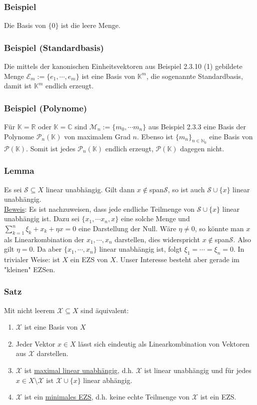 \subsubsection{Beispiel}
Die Basis von $\{0\}$ ist die leere Menge.
\subsubsection{Beispiel (Standardbasis)}
Die mittels der kanonischen Einheitsvektoren aus Beispiel 2.3.10 (1) gebildete Menge $\mathcal{E}_m:=\{e_1,\cdots ,e_m\}$ ist eine Basis von $\mathbb{K}^m$, die sogenannte Standardbasis, damit ist $\mathbb{K}^m$ endlich erzeugt.
\subsubsection{Beispiel (Polynome)}
Für $\mathbb{K}=\mathbb{R}$ oder $\mathbb{K}=\mathbb{C}$ sind $\mathcal{M}_n:=\{m_0,\cdots m_n\}$ aus Beispiel 2.3.3 eine Basis der Polynome $\mathcal{P}_n(\mathbb{K})$ von maximalem Grad $n$.  Ebenso ist $\{m_n\}_{n\in\mathbb{N}_0}$ eine Basis von $\mathcal{P}(\mathbb{K})$.  Somit ist jedes $\mathcal{P}_n(\mathbb{K})$ endlich erzeugt, $\mathcal{P}(\mathbb{K})$ dagegen nicht.
\subsubsection{Lemma}
Es sei $\mathcal{S}\subseteq X$ linear unabhängig.  Gilt dann $x\not\in$span$\mathcal{S}$, so ist auch $\mathcal{S}\cup\{x\}$ linear unabhängig. \\
\underline{Beweis}:  Es ist nachzuweisen, dass jede endliche Teilmenge von $\mathcal{S}\cup\{x\}$ linear unabhängig ist.  Dazu sei $\{x_1,\cdots x_n,x\}$ eine solche Menge und $\sum_{k=1}^n \xi _k +x_k +\eta x=0$ eine Darstellung der Null.  Wäre $\eta \not= 0$, so könnte man $x$ als Linearkombination der $x_1,\cdots ,x_n$ darstellen, dies widerspricht $x\not\in$span$\mathcal{S}$.  Also gilt $\eta = 0$.  Da aber $\{x_1,\cdots ,x_n\}$ linear unabhängig ist, folgt $\xi _1 = \cdots = \xi _n = 0$.  In trivialer Weise: ist $X$ ein EZS von $X$.  Unser Interesse besteht aber gerade im "kleinen" EZSen.
\subsubsection{Satz}
Mit nicht leerem $\mathcal{X}\subseteq X$ sind äquivalent:
\renewcommand{\labelenumi}{(\alph{enumi})}
\begin{enumerate}
\item $\mathcal{X}$ ist eine Basis von $X$
\item Jeder Vektor $x\in X$ lässt sich eindeutig als Linearkombination von Vektoren aus $\mathcal{X}$ darstellen.
\item $\mathcal{X}$ ist \underline{maximal linear unabhängig}, d.h. $\mathcal{X}$ ist linear unabhängig und für jedes $x\in X\setminus \mathcal{X}$ ist $\mathcal{X}\cup\{x\}$ linear abhängig.
\item $\mathcal{X}$ ist ein \underline{minimales EZS}, d.h. keine echte Teilmenge von $\mathcal{X}$ ist ein EZS.
\end{enumerate}
